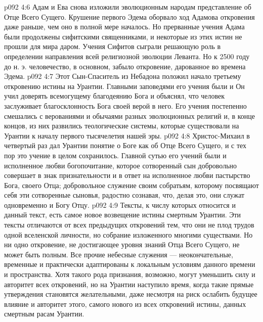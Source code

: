 \vs p092 4:6 \pc {}\bibnobreakspace {} Адам и Ева снова изложили эволюционным народам представление об Отце Всего Сущего. Крушение первого Эдема оборвало ход Адамова откровения даже раньше, чем оно в полной мере началось. Но прерванные учения Адама были продолжены сифитскими священниками, и некоторые из этих истин не прошли для мира даром. Учения Сифитов сыграли решающую роль в определении направления всей религиозной эволюции Леванта. Но к 2500 году до н. э. человечество, в основном, забыло откровение, дарованное во времена Эдема.
\vs p092 4:7 \pc {}\bibnobreakspace {} Этот Сын\hyp{}Спаситель из Небадона положил начало третьему откровению истины на Урантии. Главными заповедями его учения были  и  Он учил доверять всемогущему благодеянию Бога и объяснял, что человек заслуживает благосклонность Бога своей верой в него. Его учения постепенно смешались с верованиями и обычаями разных эволюционных религий и, в конце концов, из них развились теологические системы, которые существовали на Урантии к началу первого тысячелетия нашей эры.
\vs p092 4:8 \pc {}\bibnobreakspace {} Христос\hyp{}Михаил в четвертый раз дал Урантии понятие о Боге как об Отце Всего Сущего, и с тех пор это учение в целом сохранилось. Главной сутью его учений были  и  исполненное любви богопочитание, которое сотворенный сын добровольно совершает в знак признательности и в ответ на исполненное любви пастырство Бога, своего Отца; добровольное служение своим собратьям, которому посвящают себя эти сотворенные сыновья, радостно сознавая, что, делая это, они служат одновременно и Богу Отцу.
\vs p092 4:9 \pc {}\bibnobreakspace {} Тексты, к числу которых относится и данный текст, есть самое новое возвещение истины смертным Урантии. Эти тексты отличаются от всех предыдущих откровений тем, что они не плод трудов одной вселенской личности, но собрание изложенного многими существами. Но ни одно откровение, не достигающее уровня знаний Отца Всего Сущего, не может быть полным. Все прочие небесные служения --- неокончательные, временные и практически адаптированы к локальным условиям данного времени и пространства. Хотя такого рода признания, возможно, могут уменьшить силу и авторитет всех откровений, но на Урантии наступило время, когда такие прямые утверждения становятся желательными, даже несмотря на риск ослабить будущее влияние и авторитет этого, самого нового из всех откровений истины, данных смертным расам Урантии.
